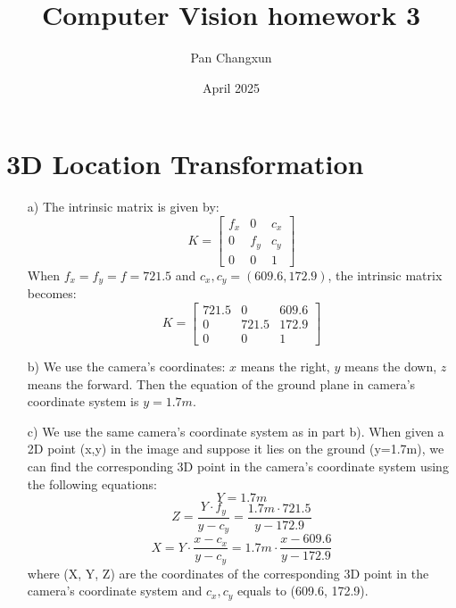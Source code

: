 \documentclass[]{article}
\title{\textbf{Computer Vision homework 3}}
\author{Pan Changxun}
\date{April 2025}
\begin{document}
\maketitle

\section{3D Location Transformation}
\begin{enumerate}
	\item[a)] The intrinsic matrix is given by:
	\begin{equation}
		K = \begin{bmatrix}
			f_x & 0 & c_x \\
			0 & f_y & c_y \\
			0 & 0 & 1
		\end{bmatrix}
	\end{equation}
	When \(f_x = f_y = f = 721.5\) and \(c_x, c_y = (609.6, 172.9)\), the intrinsic matrix becomes:
	\begin{equation}
		K = \begin{bmatrix}
			721.5 & 0 & 609.6 \\
			0 & 721.5 & 172.9 \\
			0 & 0 & 1
		\end{bmatrix}
	\end{equation}
	\item[b)] We use the camera's coordinates: \(x\) means the right, \(y\) means the down, \(z\) means the forward. Then the equation of the ground plane in camera's coordinate system is \(y=1.7m\).
	\item[c)] We use the same camera's coordinate system as in part b). 
	When given a 2D point (x,y) in the image and suppose it lies on the ground (y=1.7m), we can find the corresponding 3D point in the camera's coordinate system using the following equations:
	\begin{equation}
		Y = 1.7m
	\end{equation}
	\begin{equation}
		Z = \frac{Y \cdot f_y}{y - c_y} = \frac{1.7m \cdot 721.5}{y - 172.9}
	\end{equation}
	\begin{equation}
		X = Y \cdot \frac{x - c_x}{y - c_y} = 1.7m \cdot \frac{x - 609.6}{y - 172.9}
	\end{equation}
	where (X, Y, Z) are the coordinates of the corresponding 3D point in the camera's coordinate system and \(c_x, c_y\) equals to (609.6, 172.9).
\end{enumerate}
\end{document}
